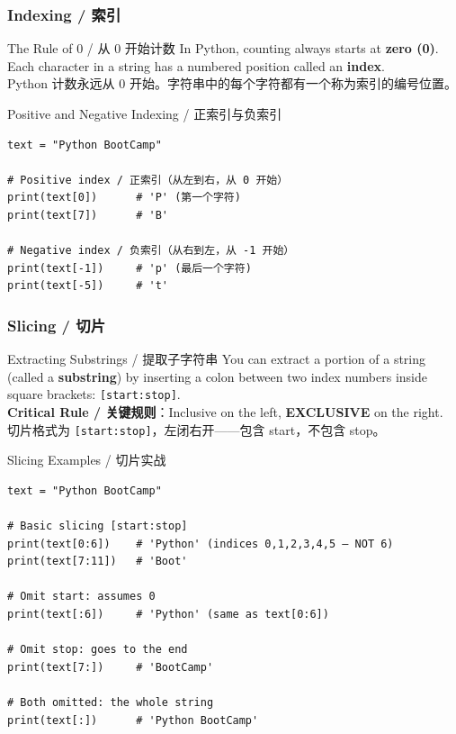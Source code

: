 \documentclass[11pt,a4paper]{article}
\begin{document}
\subsubsection{Indexing / 索引}
\begin{concept}{The Rule of 0 / 从 0 开始计数}
    In Python, counting always starts at \textbf{zero (0)}. Each character in a string has a numbered position called an \textbf{index}. \\
    Python 计数永远从 0 开始。字符串中的每个字符都有一个称为索引的编号位置。
\end{concept}

\begin{examplebox}{Positive and Negative Indexing / 正索引与负索引}
\begin{lstlisting}
text = "Python BootCamp"

# Positive index / 正索引（从左到右，从 0 开始）
print(text[0])      # 'P' (第一个字符)
print(text[7])      # 'B'

# Negative index / 负索引（从右到左，从 -1 开始）
print(text[-1])     # 'p' (最后一个字符)
print(text[-5])     # 't'
\end{lstlisting}
\end{examplebox}

\subsubsection{Slicing / 切片}
\begin{concept}{Extracting Substrings / 提取子字符串}
    You can extract a portion of a string (called a \textbf{substring}) by inserting a colon between two index numbers inside square brackets: \texttt{[start:stop]}. \\
    \textbf{Critical Rule / 关键规则}：Inclusive on the left, \textbf{EXCLUSIVE} on the right. \\
    切片格式为 \texttt{[start:stop]}，左闭右开——包含 start，不包含 stop。
\end{concept}

\begin{examplebox}{Slicing Examples / 切片实战}
\begin{lstlisting}
text = "Python BootCamp"

# Basic slicing [start:stop]
print(text[0:6])    # 'Python' (indices 0,1,2,3,4,5 — NOT 6)
print(text[7:11])   # 'Boot'

# Omit start: assumes 0
print(text[:6])     # 'Python' (same as text[0:6])

# Omit stop: goes to the end
print(text[7:])     # 'BootCamp'

# Both omitted: the whole string
print(text[:])      # 'Python BootCamp'
\end{lstlisting}
\end{examplebox}
\end{document}
